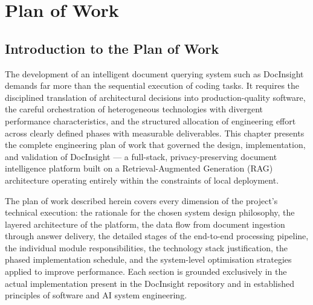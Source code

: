 
\chapter{Plan of Work}

\section{Introduction to the Plan of Work}

The development of an intelligent document querying system such as DocInsight demands far more than the sequential execution of coding tasks. It requires the disciplined translation of architectural decisions into production-quality software, the careful orchestration of heterogeneous technologies with divergent performance characteristics, and the structured allocation of engineering effort across clearly defined phases with measurable deliverables. This chapter presents the complete engineering plan of work that governed the design, implementation, and validation of DocInsight --- a full-stack, privacy-preserving document intelligence platform built on a Retrieval-Augmented Generation (RAG) architecture operating entirely within the constraints of local deployment.

The plan of work described herein covers every dimension of the project's technical execution: the rationale for the chosen system design philosophy, the layered architecture of the platform, the data flow from document ingestion through answer delivery, the detailed stages of the end-to-end processing pipeline, the individual module responsibilities, the technology stack justification, the phased implementation schedule, and the system-level optimisation strategies applied to improve performance. Each section is grounded exclusively in the actual implementation present in the DocInsight repository and in established principles of software and AI system engineering.

